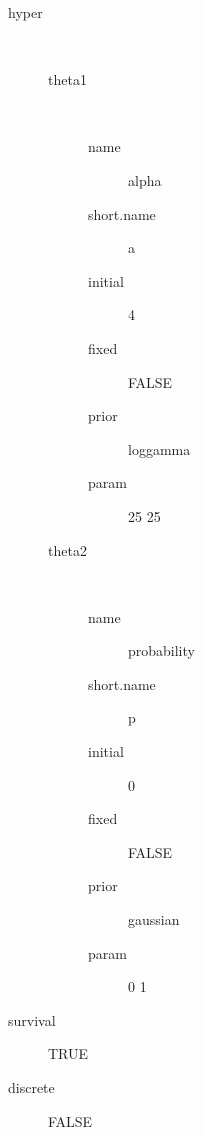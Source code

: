 \begin{description}
	\item[hyper]\ 
	 \begin{description}
	 	\item[theta1]\ 
	 	 \begin{description}
	 	 	 \item[ name ] alpha 
	 	 	 \item[ short.name ] a 
	 	 	 \item[ initial ] 4 
	 	 	 \item[ fixed ] FALSE 
	 	 	 \item[ prior ] loggamma 
	 	 	 \item[ param ] 25 25 
	 	 \end{description}
	 	\item[theta2]\ 
	 	 \begin{description}
	 	 	 \item[ name ] probability 
	 	 	 \item[ short.name ] p 
	 	 	 \item[ initial ] 0 
	 	 	 \item[ fixed ] FALSE 
	 	 	 \item[ prior ] gaussian 
	 	 	 \item[ param ] 0 1 
	 	 \end{description}
	 \end{description}
	 \item[ survival ] TRUE 
	 \item[ discrete ] FALSE 
\end{description}
